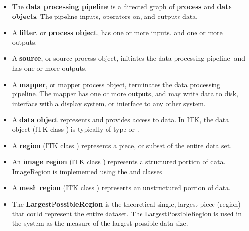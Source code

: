 \begin{itemize}
        \item The \textbf{data processing pipeline} is a directed graph of
        \textbf{process} and \textbf{data objects}. The pipeline inputs,
        operators on, and outputs data.

        \item A \textbf{filter}, or \textbf{process object}, has one or more
        inputs, and one or more outputs.

        \item A \textbf{source}, or source process object, initiates the data
        processing pipeline, and has one or more outputs.

        \item A \textbf{mapper}, or mapper process object, terminates the
        data processing pipeline. The mapper has one or more outputs, and may
        write data to disk, interface with a display system, or interface to
        any other system.

        \item A \textbf{data object} represents and provides access to
        data. In ITK, the data object (ITK class ) is
        typically of type  or .

        \item A \textbf{region} (ITK class ) represents a
        piece, or subset of the entire data set.

        \item An \textbf{image region} (ITK class )
        represents a structured portion of data. ImageRegion is implemented
        using the  and  classes

        \item A \textbf{mesh region} (ITK class )
        represents an unstructured portion of data.

        \item The \textbf{LargestPossibleRegion} is the theoretical single,
        largest piece (region) that could represent the entire dataset. The
        LargestPossibleRegion is used in the system as the measure of the
        largest possible data size.


\end{itemize}
